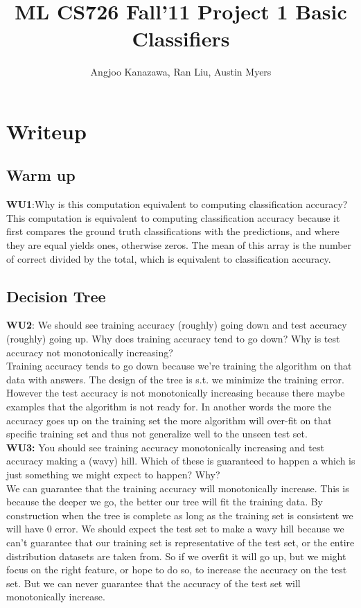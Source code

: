 \documentclass[a4paper,11pt]{article}
\begin{document}
\title{ML CS726 Fall'11 Project 1 Basic Classifiers}
\author{Angjoo Kanazawa, Ran Liu, Austin Myers}
\maketitle


\section{Writeup}
\subsection{Warm up}
\textbf{WU1}:\textsf{Why is this computation equivalent to computing classification
accuracy?}\\

This computation is equivalent to computing classification accuracy
because it first compares the ground truth classifications with the
predictions, and where they are equal yields ones, otherwise
zeros. The mean of this array is the number of correct divided by the
total, which is equivalent to classification accuracy.

\subsection{Decision Tree}
\textbf{WU2}:\textsf{ We should see training accuracy (roughly) going down and
test accuracy (roughly) going up.  Why does training accuracy tend to
go down?  Why is test accuracy not monotonically
increasing?}\\

Training accuracy tends to go down because we're training the
algorithm on that data with answers. The design of the tree is s.t. we
minimize the training error. However the test accuracy is not
monotonically increasing because there maybe examples that the
algorithm is not ready for. In another words the more the accuracy
goes up on the training set the more algorithm will over-fit on that
specific training set and thus not generalize well to the unseen test set.\\

\noindent
\textbf{WU3:} \textsf{You should see training accuracy monotonically increasing
and test accuracy making a (wavy) hill.  Which of these
is guaranteed to happen a which is just something we might
expect to happen?  Why?}\\

We can guarantee that the training accuracy will monotonically
increase. This is because the deeper we go, the better our tree will
fit the training data. By construction when the tree is complete as
long as the training set is consistent we will have 0 error. We should
expect the test set to make a wavy hill because we can't guarantee that
our training set is representative of the test set, or the entire
distribution datasets are taken from. So if we overfit it will go up,
but we might focus on the right feature, or hope to do so, to increase
the accuracy on the test set. But we can never guarantee that the
accuracy of the test set will monotonically increase.\\
\end{document}
